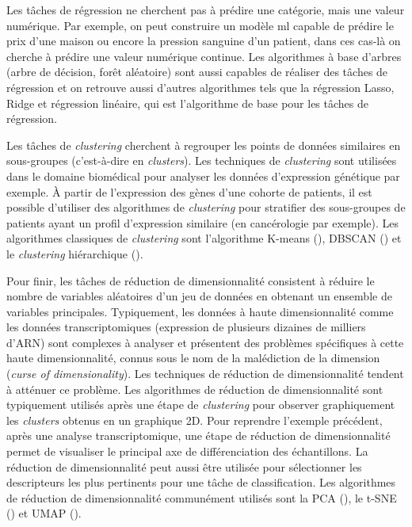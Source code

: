 Les tâches de régression ne cherchent pas à prédire une catégorie, mais une valeur numérique. Par exemple, on peut construire un modèle \gls{ml} capable de prédire le prix d'une maison ou encore la pression sanguine d'un patient, dans ces cas-là on cherche à prédire une valeur numérique continue. Les algorithmes à base d'arbres (arbre de décision, forêt aléatoire) sont aussi capables de réaliser des tâches de régression et on retrouve aussi d'autres algorithmes tels que la régression Lasso, Ridge et régression linéaire, qui est l'algorithme de base pour les tâches de régression.

Les tâches de \textit{clustering} cherchent à regrouper les points de données similaires en sous-groupes (c'est-à-dire en \textit{clusters}). Les techniques de \textit{clustering} sont utilisées dans le domaine biomédical pour analyser les données d'expression génétique par exemple. À partir de l'expression des gènes d'une cohorte de patients, il est possible d'utiliser des algorithmes de \textit{clustering} pour stratifier des sous-groupes de patients ayant un profil d'expression similaire (en cancérologie par exemple). Les algorithmes classiques de \textit{clustering} sont l'algorithme K-means (\cite{macqueen_methods_1967}), DBSCAN (\cite{ester_density-based_1996}) et le \textit{clustering} hiérarchique (\cite{cohen-addad_hierarchical_2017}).

Pour finir, les tâches de réduction de dimensionnalité consistent à réduire le nombre de variables aléatoires d'un jeu de données en obtenant un ensemble de variables principales. Typiquement, les données à haute dimensionnalité comme les données transcriptomiques (expression de plusieurs dizaines de milliers d'ARN) sont complexes à analyser et présentent des problèmes spécifiques à cette haute dimensionnalité, connus sous le nom de la malédiction de la dimension (\textit{curse of dimensionality}). Les techniques de réduction de dimensionnalité tendent à atténuer ce problème. Les algorithmes de réduction de dimensionnalité sont typiquement utilisés après une étape de \textit{clustering} pour observer graphiquement les \textit{clusters} obtenus en un graphique 2D. Pour reprendre l'exemple précédent, après une analyse transcriptomique, une étape de réduction de dimensionnalité permet de visualiser le principal axe de différenciation des échantillons. La réduction de dimensionnalité peut aussi être utilisée pour sélectionner les descripteurs les plus pertinents pour une tâche de classification.  Les algorithmes de réduction de dimensionnalité communément utilisés sont la PCA (\cite{mackiewicz_principal_1993}), le t-SNE (\cite{maaten_visualizing_2008}) et UMAP (\cite{mcinnes_umap_2020}).

